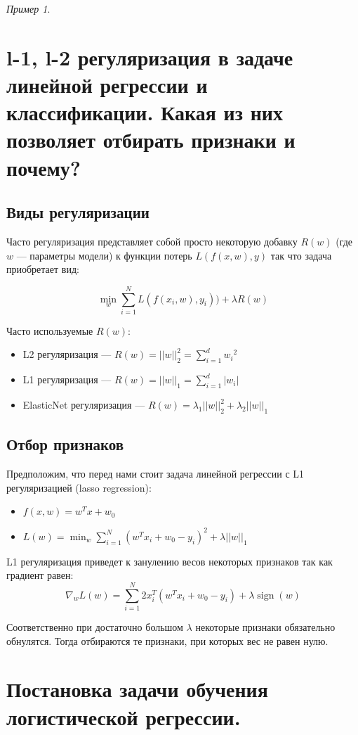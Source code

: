 \documentclass[a4paper, 12pt]{article}
\DeclareMathOperator{\sgn}{sign }
\theoremstyle{plain} %
\theoremstyle{definition} %
\theoremstyle{remark} %
\newtheorem{example}{Пример}
\begin{document}
\begin{example}
\section{l-1, l-2 регуляризация в задаче линейной регрессии и классификации. Какая из них позволяет отбирать признаки и почему?}

\subsection{Виды регуляризации}

Часто регуляризация представляет собой просто некоторую добавку $ R(w) $
 (где $ w $
 — параметры модели) к функции потерь $ L(f(x, w), y) $
 так что задача приобретает вид:

\[
	\min_{\displaystyle w} \sum_{i=1}^N L(f(x_i, w), y_i)) + \lambda R(w)
\]

Часто используемые $ R(w) $:
\begin{itemize}
	\item L2 регуляризация — $ R(w) = ||w||_2^2 = \sum_{i=1}^d {w_i}^2 $
	\item L1 регуляризация — $ R(w) = ||w||_1 = \sum_{i=1}^d |w_i| $
	\item ElasticNet регуляризация — $ R(w) = \lambda_1 ||w||_2^2 + \lambda_2 ||w||_1 $
\end{itemize}

\subsection{Отбор признаков}

Предположим, что перед нами стоит задача линейной регрессии с L1 регуляризацией (lasso regression):

\begin{itemize}
	\item $ f(x, w) = w^Tx + w_0 $
	\item $ L(w) = \min_{\displaystyle w} \sum_{i=1}^N (w^Tx_i + w_0 - y_i)^2 + \lambda ||w||_1 $
\end{itemize}

L1 регуляризация приведет к занулению весов некоторых признаков так как градиент равен:
\[
	\nabla_w L(w) = \sum_{i=1}^N 2x_i^T (w^Tx_i + w_0 - y_i) + \lambda \sgn(w)
\]

Соответственно при достаточно большом $ \lambda $
 некоторые признаки обязательно обнулятся. Тогда отбираются те признаки, при которых вес не равен нулю.

\section{Постановка задачи обучения логистической регрессии.}


\end{example}
\end{document}
